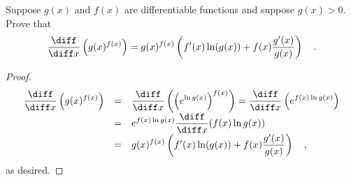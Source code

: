 \begin{frame}
\begin{example}
Suppose $g(x)$ and $f(x)$ are differentiable functions and suppose $g(x)>0$. Prove that
\[
\frac{\diff}{\diff x} \left(g(x)^{f(x)} \right)=g(x)^{f(x)} \left( f'(x) \ln (g(x)) + f(x)\frac{g'(x)}{g(x)}\right) \quad .
\]
\end{example}
\begin{proof}
\[
\begin{array}{rcl}
\displaystyle \frac{\diff }{\diff x} \left(g(x)^{f(x)} \right)&=&\displaystyle \frac{\diff }{\diff x} \left( \left(e^{\ln g(x)}\right)^{f(x)} \right)=\frac{\diff }{\diff x} \left(e^{f(x)\ln g(x)} \right)\\
&=&\displaystyle e^{f(x)\ln g(x)} \frac{\diff }{\diff x} (f(x) \ln g(x)) \\
&=&\displaystyle 
g(x)^{f(x)} \left( f'(x) \ln (g(x)) + f(x)\frac{g'(x)}{g(x)}\right)\quad ,
\end{array}
\]
as desired.
\end{proof}
\end{frame}

